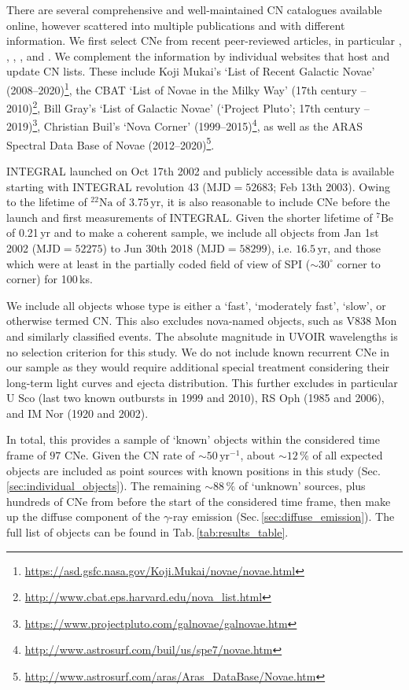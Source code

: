 \documentclass{aa}
\newcommand{\mrm}[1]{\mathrm{#1}}
\newcommand{\nuc}[2]{$\mrm{^{#2}#1}$}
\begin{document}
There are several comprehensive and well-maintained CN catalogues available online, however scattered into multiple publications and with different information.
%
We first select CNe from recent peer-reviewed articles, in particular \citet{Ozdonmez2018_novacat}, \citet{Shafter2017_novarate}, \citet[][SMEI]{Hounsell2016_SMEInovae}, \citet[][VVV]{Saito2013_VVVnovae}, and \citet[][SMARTS]{Walter2012_SMARTSnovae}.
%
We complement the information by individual websites that host and update CN lists.
%
These include Koji Mukai's `List of Recent Galactic Novae' (2008--2020)\footnote{\url{https://asd.gsfc.nasa.gov/Koji.Mukai/novae/novae.html}}, the CBAT `List of Novae in the Milky Way' (17th century -- 2010)\footnote{\url{http://www.cbat.eps.harvard.edu/nova_list.html}}, Bill Gray's `List of Galactic Novae' (`Project Pluto'; 17th century -- 2019)\footnote{\url{https://www.projectpluto.com/galnovae/galnovae.htm}}, Christian Buil's `Nova Corner' (1999--2015)\footnote{\url{http://www.astrosurf.com/buil/us/spe7/novae.htm}}, as well as the ARAS Spectral Data Base of Novae (2012--2020)\footnote{\url{http://www.astrosurf.com/aras/Aras_DataBase/Novae.htm}}.

INTEGRAL launched on Oct 17th 2002 \citep{Winkler2003_INTEGRAL} and publicly accessible data is available starting with INTEGRAL revolution 43 ($\mrm{MJD} = 52683$; Feb 13th 2003).
%
Owing to the lifetime of \nuc{Na}{22} of 3.75\,yr, it is also reasonable to include CNe before the launch and first measurements of  INTEGRAL.
%
Given the shorter lifetime of \nuc{Be}{7} of 0.21\,yr and to make a coherent sample, we include all objects from Jan 1st 2002 ($\mrm{MJD} = 52275$) to Jun 30th 2018 ($\mrm{MJD} = 58299$), i.e. $16.5\,\mrm{yr}$, and those which were at least in the partially coded field of view of SPI ($\sim 30^{\circ}$ corner to corner) for 100\,ks.

We include all objects whose type is either a `fast', `moderately fast', `slow', or otherwise termed CN.
%
This also excludes nova-named objects, such as V838 Mon \citep{Bond2003_V838Mon} and similarly classified events.
%
The absolute magnitude in UVOIR wavelengths is no selection criterion for this study.
%
We do not include known recurrent CNe in our sample as they would require additional special treatment considering their long-term light curves and ejecta distribution.
%
This further excludes in particular U Sco (last two known outbursts in 1999 and 2010), RS Oph (1985 and 2006), and IM Nor (1920 and 2002).

In total, this provides a sample of `known' objects within the considered time frame of $97$ CNe.
%
Given the CN rate of $\sim 50\,\mrm{yr^{-1}}$, about $\sim 12\,\%$ of all expected objects are included as point sources with known positions in this study (Sec.\,\ref{sec:individual_objects}).
%
The remaining $\sim 88\,\%$ of `unknown' sources, plus hundreds of CNe from before the start of the considered time frame, then make up the diffuse component of the $\gamma$-ray emission (Sec.\,\ref{sec:diffuse_emission}).
%
The full list of objects can be found in Tab.\,\ref{tab:results_table}.
\end{document}
